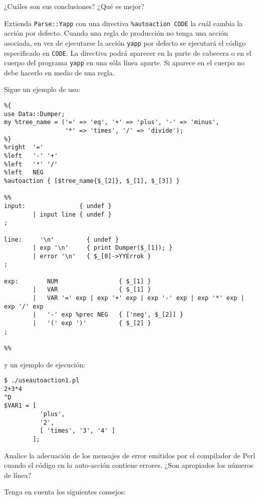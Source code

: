 ¿Cu\'ales son sus conclusiones? ¿Qué es mejor?



Extienda \verb|Parse::Yapp| con una directiva \verb|%autoaction CODE| la
cuál cambia la acción por defecto. Cuando una regla de producción 
no tenga una acción asociada, en vez de ejecutarse la acción
\verb|yapp| por defecto %
se ejecutará el código especificado en \verb|CODE|. 
La directiva podrá aparecer en la
parte de cabecera o en el cuerpo del programa \verb|yapp| 
en una sóla línea aparte. Si aparece en el cuerpo no debe hacerlo
en medio de una regla.


Sigue un ejemplo de uso:

\begin{verbatim}
%{
use Data::Dumper;
my %tree_name = ('=' => 'eq', '+' => 'plus', '-' => 'minus', 
                 '*' => 'times', '/' => 'divide');
%}
%right  '='
%left   '-' '+'
%left   '*' '/'
%left   NEG
%autoaction { [$tree_name{$_[2]}, $_[1], $_[3]] }

%%
input:               { undef }
        | input line { undef } 
;

line:     '\n'         { undef }
        | exp '\n'     { print Dumper($_[1]); }
        | error '\n'   { $_[0]->YYErrok }
;

exp:        NUM                 { $_[1] }
        |   VAR                 { $_[1] }
        |   VAR '=' exp | exp '+' exp | exp '-' exp | exp '*' exp | exp '/' exp      
        |   '-' exp %prec NEG   { ['neg', $_[2]] }
        |   '(' exp ')'         { $_[2] }
;

%%
\end{verbatim}
y un ejemplo de ejecución:
\begin{verbatim}
$ ./useautoaction1.pl
2+3*4
^D
$VAR1 = [
          'plus',
          '2',
          [ 'times', '3', '4' ]
        ];
\end{verbatim}
Analice la adecuación de los mensajes de error emitidos por
el compilador de Perl cuando el código en la auto-acción contiene
errores. ¿Son apropiados los números de línea?

Tenga en cuenta los siguientes consejos:

